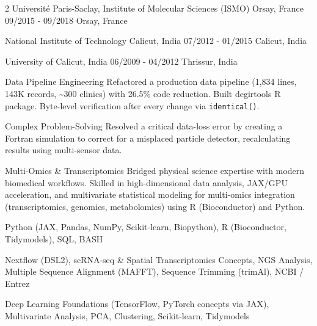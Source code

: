 \documentclass{thejus_cv}
\begin{document}
\begin{paracol}{2}
             {Universit\'e Paris-Saclay, Institute of Molecular Sciences (ISMO) Orsay, France}
             {09/2015 - 09/2018}
             {Orsay, France}
             {}

             {National Institute of Technology Calicut, India}
             {07/2012 - 01/2015}
             {Calicut, India}
             {}

             {University of Calicut, India}
             {06/2009 - 04/2012}
             {Thrissur, India}
             {}



\switchcolumn



\cvstrength{\faStar}
           {Data Pipeline Engineering}
           {Refactored a production data pipeline (1,834 lines, 143K records, \textasciitilde300 clinics) with 26.5\% code reduction. Built degirtools R package. Byte-level verification after every change via \texttt{identical()}.}

\cvstrength{\faLightbulb}
           {Complex Problem-Solving}
           {Resolved a critical data-loss error by creating a Fortran simulation to correct for a misplaced particle detector, recalculating results using multi-sensor data.}

\cvstrength{\faAward}
           {Multi-Omics \& Transcriptomics}
           {Bridged physical science expertise with modern biomedical workflows. Skilled in high-dimensional data analysis, JAX/GPU acceleration, and multivariate statistical modeling for multi-omics integration (transcriptomics, genomics, metabolomics) using R (Bioconductor) and Python.}


         {Python (JAX, Pandas, NumPy, Scikit-learn, Biopython), R (Bioconductor, Tidymodels), SQL, BASH}

         {Nextflow (DSL2), scRNA-seq \& Spatial Transcriptomics Concepts, NGS Analysis, Multiple Sequence Alignment (MAFFT), Sequence Trimming (trimAl), NCBI / Entrez}

         {Deep Learning Foundations (TensorFlow, PyTorch concepts via JAX), Multivariate Analysis, PCA, Clustering, Scikit-learn, Tidymodels}


\end{paracol}
\end{document}
